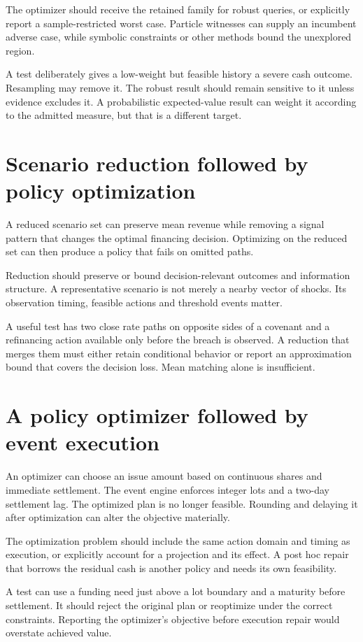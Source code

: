 The optimizer should receive the retained family for robust queries, or explicitly report a sample-restricted worst case. Particle witnesses can supply an incumbent adverse case, while symbolic constraints or other methods bound the unexplored region.

A test deliberately gives a low-weight but feasible history a severe cash outcome. Resampling may remove it. The robust result should remain sensitive to it unless evidence excludes it. A probabilistic expected-value result can weight it according to the admitted measure, but that is a different target.

\section{Scenario reduction followed by policy optimization}
A reduced scenario set can preserve mean revenue while removing a signal pattern that changes the optimal financing decision. Optimizing on the reduced set can then produce a policy that fails on omitted paths.

Reduction should preserve or bound decision-relevant outcomes and information structure. A representative scenario is not merely a nearby vector of shocks. Its observation timing, feasible actions and threshold events matter.

A useful test has two close rate paths on opposite sides of a covenant and a refinancing action available only before the breach is observed. A reduction that merges them must either retain conditional behavior or report an approximation bound that covers the decision loss. Mean matching alone is insufficient.

\section{A policy optimizer followed by event execution}
An optimizer can choose an issue amount based on continuous shares and immediate settlement. The event engine enforces integer lots and a two-day settlement lag. The optimized plan is no longer feasible. Rounding and delaying it after optimization can alter the objective materially.

The optimization problem should include the same action domain and timing as execution, or explicitly account for a projection and its effect. A post hoc repair that borrows the residual cash is another policy and needs its own feasibility.

A test can use a funding need just above a lot boundary and a maturity before settlement. It should reject the original plan or reoptimize under the correct constraints. Reporting the optimizer's objective before execution repair would overstate achieved value.

